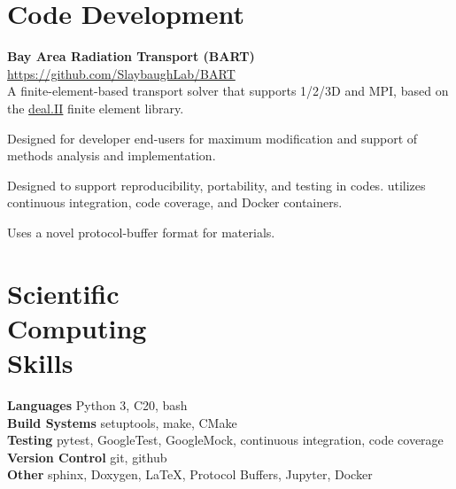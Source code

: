 \documentclass[margin,line]{resume}
\newcommand{\Cpp}[1][]{\textrm{C\nolinebreak[4]\hspace{-.05em}\raisebox{.4ex}{\tiny\bfseries++}#1}}
\begin{document}
\begin{resume}
        
        \section{\mysidestyle Code Development}
        \textbf{Bay Area Radiation Transport (BART)} \hfill
        \url{https://github.com/SlaybaughLab/BART} \\
        A finite-element-based transport solver that
                  supports 1/2/3D and MPI, based on the \href{https://www.dealii.org/}{deal.II}
                  finite element library.
                \begin{list2}
                \item Designed for developer end-users for maximum
                  modification and support of methods analysis and
                  implementation.
                \item Designed to support reproducibility,
                  portability, and testing in codes. utilizes
                  continuous integration, code coverage, and Docker
                  containers.
                \item Uses a novel protocol-buffer format for materials.
                \end{list2}
    \section{\mysidestyle Scientific\\Computing\\Skills}
                \textbf{Languages} \dotfill  Python 3, \Cpp{20}, bash\vspace{1mm}\\%
                \textbf{Build Systems} \dotfill setuptools, make, CMake \vspace{1mm}\\%
                \textbf{Testing} \dotfill pytest, GoogleTest, GoogleMock, continuous integration, code coverage\vspace{1mm}\\%
                \textbf{Version Control} \dotfill git, github\vspace{1mm}\\%
                \textbf{Other} \dotfill sphinx, Doxygen, \LaTeX, 
                Protocol Buffers, Jupyter, Docker \vspace{1mm}%


\end{resume}
\end{document}
